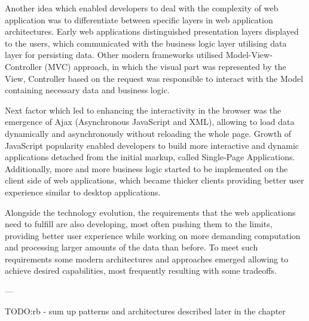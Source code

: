 Another idea which enabled developers to deal with the complexity of web application was to differentiate between specific layers in web application architectures. Early web applications distinguished presentation layers displayed to the users, which communicated with the business logic layer utilising data layer for persisting data. Other modern frameworks utilised Model-View-Controller (MVC) approach, in which the visual part was represented by the View, Controller based on the request was responsible to interact with the Model containing necessary data and business logic.

Next factor which led to enhancing the interactivity in the browser was the emergence of Ajax (Asynchronous JavaScript and XML), allowing to load data dynamically and asynchronously without reloading the whole page. Growth of JavaScript popularity enabled developers to build more interactive and dynamic applications detached from the initial markup, called Single-Page Applications. Additionally, more and more business logic started to be implemented on the client side of web applications, which became thicker clients providing better user experience similar to desktop applications.

Alongside the technology evolution, the requirements that the web applications need to fulfill are also developing, most often pushing them to the limits, providing better user experience while working on more demanding computation and processing larger amounts of the data than before. To meet such requirements some modern architectures and approaches emerged allowing to achieve desired capabilities, most frequently resulting with some tradeoffs.

---

TODO:rb - sum up patterns and architectures described later in the chapter





